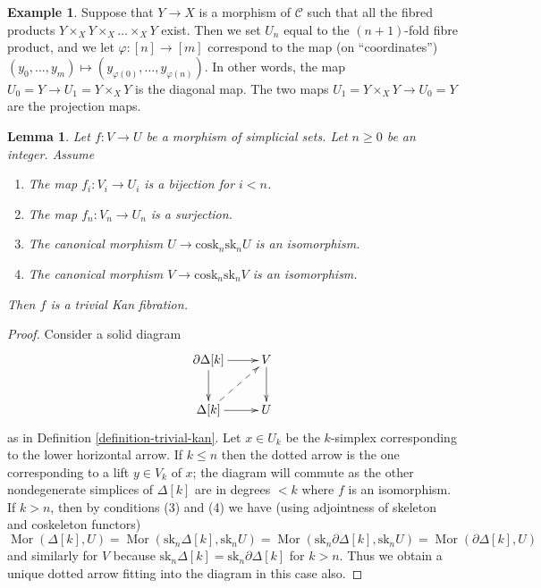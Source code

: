 \documentclass{stacks-project}
\theoremstyle{plain}
\newtheorem{lemma}[subsection]{Lemma}
\theoremstyle{definition}
\newtheorem{example}[subsection]{Example}
\theoremstyle{remark}
\numberwithin{equation}{subsection}
\def\Mor{\mathop{\mathrm{Mor}}\nolimits}
\begin{document}
\begin{example}
\label{example-fibre-products-simplicial-object}
Suppose that $Y\to X$ is a morphism of $\mathcal{C}$ such that all
the fibred products $Y \times_X Y \times_X \ldots \times_X Y$ exist.
Then we set $U_n$ equal to the $(n + 1)$-fold fibre product,
and we let $\varphi : [n] \to [m]$ correspond to the map
(on ``coordinates'')
$(y_0, \ldots, y_m) \mapsto (y_{\varphi(0)}, \ldots, y_{\varphi(n)})$.
In other words, the map $U_0 = Y \to U_1 = Y \times_X Y$ is the
diagonal map. The two maps $U_1 = Y \times_X Y \to U_0 = Y$ are the
projection maps.
\end{example}

\begin{lemma}
\label{lemma-section}
Let $f : V \to U$ be a morphism of simplicial sets. Let $n \geq 0$ be an
integer. Assume
\begin{enumerate}
\item The map $f_i : V_i \to U_i$ is a bijection for $i < n$.
\item The map $f_n : V_n \to U_n$ is a surjection.
\item The canonical morphism $U \to \text{cosk}_n \text{sk}_n U$
is an isomorphism.
\item The canonical morphism $V \to \text{cosk}_n \text{sk}_n V$
is an isomorphism.
\end{enumerate}
Then $f$ is a trivial Kan fibration.
\end{lemma}

\begin{proof}
Consider a solid diagram
$$
\xymatrix{
\partial \Delta[k] \ar[r] \ar[d] & V \ar[d] \\
\Delta[k] \ar[r] \ar@{-->}[ru] & U
}
$$
as in Definition \ref{definition-trivial-kan}. Let $x \in U_k$ be
the $k$-simplex corresponding to the lower horizontal arrow.
If $k \leq n$ then the dotted arrow is the one corresponding to
a lift $y \in V_k$ of $x$; the diagram will commute as the other
nondegenerate simplices of $\Delta[k]$ are in degrees $< k$ where
$f$ is an isomorphism. If $k > n$, then by conditions (3) and (4)
we have (using adjointness of skeleton and coskeleton functors)
$$
\Mor(\Delta[k], U) =
\Mor(\text{sk}_n\Delta[k], \text{sk}_nU) =
\Mor(\text{sk}_n\partial\Delta[k], \text{sk}_nU) =
\Mor(\partial \Delta[k], U)
$$
and similarly for $V$ because
$\text{sk}_n\Delta[k] = \text{sk}_n\partial\Delta[k]$ for $k > n$.
Thus we obtain a unique dotted arrow fitting into the diagram in
this case also.
\end{proof}
\end{document}
